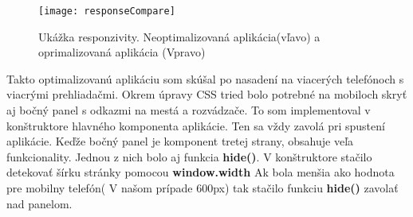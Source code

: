 \documentclass[11pt, oneside]{report}
\begin{document}
\begin{figure}[h]
    \centering
    \texttt{[image: responseCompare]}
    \caption{Ukážka responzivity. Neoptimalizovaná aplikácia(vľavo) a oprimalizovaná aplikácia (Vpravo) }
    \label{fig:mesh1}
\end{figure}
Takto optimalizovanú aplikáciu som skúšal po nasadení na viacerých telefónoch s viacrými prehliadačmi. Okrem úpravy CSS tried bolo potrebné na mobiloch skryť aj  bočný panel s  odkazmi na mestá a rozvádzače. To som  implementoval v konštruktore hlavného komponenta  aplikácie. Ten sa vždy zavolá pri spustení aplikácie. Keďže bočný panel je komponent tretej strany, obsahuje veľa funkcionality. Jednou z nich bolo aj funkcia \textbf{hide()}. V konštruktore  stačilo detekovať šírku stránky pomocou \textbf{window.width} Ak bola menšia ako  hodnota pre mobilny telefón( V našom prípade 600px) tak stačilo funkciu \textbf{hide()} zavolať nad panelom. 
\newpage
\end{document}

